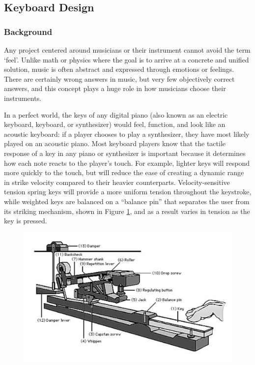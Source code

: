 \subsection{Keyboard Design}

\subsubsection{Background}

Any project centered around musicians or their instrument cannot avoid the term ‘feel’. Unlike math or physics where the goal is to arrive at a concrete and unified solution, music is often abstract and expressed through emotions or feelings. There are certainly wrong answers in music, but very few objectively correct answers, and this concept plays a huge role in how musicians choose their instruments.

In a perfect world, the keys of any digital piano (also known as an electric keyboard, keyboard, or synthesizer) would feel, function, and look like an acoustic keyboard: if a player chooses to play a synthesizer, they have most likely played on an acoustic piano. Most keyboard players know that the tactile response of a key in any piano or synthesizer is important because it determines how each note reacts to the player’s touch. For example, lighter keys will respond more quickly to the touch, but will reduce the ease of creating a dynamic range in strike velocity compared to their heavier counterparts. Velocity-sensitive tension spring keys will provide a more uniform tension throughout the keystroke, while weighted keys are balanced on a “balance pin” that separates the user from its striking mechanism, shown in Figure \ref{fig:key_mechanism}, and as a result varies in tension as the key is pressed.

\begin{figure}[h!]
  \centering
  \includegraphics[width=\linewidth]{image/KeyMechanism.png}
  \caption{}
  \label{fig:key_mechanism}
\end{figure}

